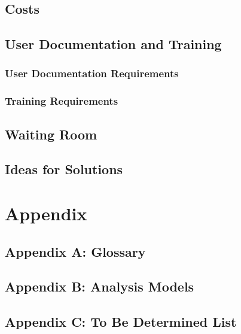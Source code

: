\documentclass{scrreprt}
\begin{document}
\section{Costs}

\section{User Documentation and Training}

\subsection{User Documentation Requirements}

\subsection{Training Requirements}

\section{Waiting Room}

\section{Ideas for Solutions}

\chapter{Appendix}

\section{Appendix A: Glossary}

\section{Appendix B: Analysis Models}

\section{Appendix C: To Be Determined List}
\end{document}
